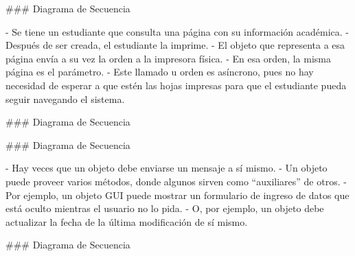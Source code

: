 ### Diagrama de Secuencia



- Se tiene un estudiante que consulta una página con su información académica.
- Después de ser creada, el estudiante la imprime.
    - El objeto que representa a esa página envía a su vez la orden a la impresora física.
    - En esa orden, la misma página es el parámetro.
    - Este llamado u orden es asíncrono, pues no hay necesidad de esperar a que estén las hojas impresas
    para que el estudiante pueda seguir navegando el sistema.

### Diagrama de Secuencia





### Diagrama de Secuencia


- Hay veces que un objeto debe enviarse un mensaje a sí mismo.
    - Un objeto puede proveer varios métodos, donde algunos sirven como ``auxiliares'' de otros.
    - Por ejemplo, un objeto GUI puede mostrar un formulario de ingreso de datos que está
    oculto mientras el usuario no lo pida.
    - O, por ejemplo, un objeto debe actualizar la fecha de la última modificación de sí mismo.

### Diagrama de Secuencia


